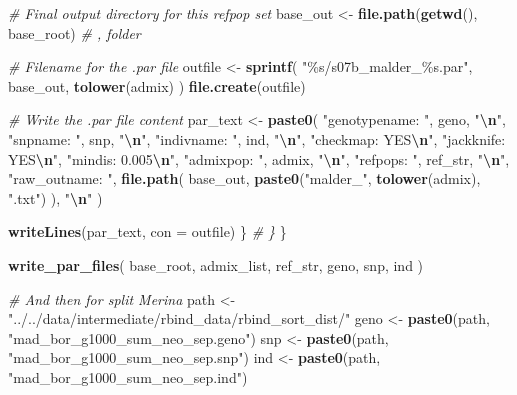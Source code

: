 \documentclass[
]{article}
\newenvironment{Shaded}{\begin{snugshade}}{\end{snugshade}}
\newcommand{\AttributeTok}[1]{\textcolor[rgb]{0.13,0.29,0.53}{#1}}
\newcommand{\CommentTok}[1]{\textcolor[rgb]{0.56,0.35,0.01}{\textit{#1}}}
\newcommand{\FunctionTok}[1]{\textcolor[rgb]{0.13,0.29,0.53}{\textbf{#1}}}
\newcommand{\NormalTok}[1]{#1}
\newcommand{\OtherTok}[1]{\textcolor[rgb]{0.56,0.35,0.01}{#1}}
\newcommand{\SpecialCharTok}[1]{\textcolor[rgb]{0.81,0.36,0.00}{\textbf{#1}}}
\newcommand{\StringTok}[1]{\textcolor[rgb]{0.31,0.60,0.02}{#1}}
\begin{document}
\begin{Shaded}
\begin{Highlighting}[]
    \CommentTok{\# Final output directory for this refpop set}
\NormalTok{    base\_out }\OtherTok{\textless{}{-}} \FunctionTok{file.path}\NormalTok{(}\FunctionTok{getwd}\NormalTok{(), base\_root) }\CommentTok{\# , folder}

    \CommentTok{\# Filename for the .par file}
\NormalTok{    outfile }\OtherTok{\textless{}{-}} \FunctionTok{sprintf}\NormalTok{(}
      \StringTok{"\%s/s07b\_malder\_\%s.par"}\NormalTok{,}
\NormalTok{      base\_out, }\FunctionTok{tolower}\NormalTok{(admix)}
\NormalTok{    )}
    \FunctionTok{file.create}\NormalTok{(outfile)}

    \CommentTok{\# Write the .par file content}
\NormalTok{    par\_text }\OtherTok{\textless{}{-}} \FunctionTok{paste0}\NormalTok{(}
      \StringTok{"genotypename: "}\NormalTok{, geno, }\StringTok{"}\SpecialCharTok{\textbackslash{}n}\StringTok{"}\NormalTok{,}
      \StringTok{"snpname: "}\NormalTok{, snp, }\StringTok{"}\SpecialCharTok{\textbackslash{}n}\StringTok{"}\NormalTok{,}
      \StringTok{"indivname: "}\NormalTok{, ind, }\StringTok{"}\SpecialCharTok{\textbackslash{}n}\StringTok{"}\NormalTok{,}
      \StringTok{"checkmap: YES}\SpecialCharTok{\textbackslash{}n}\StringTok{"}\NormalTok{,}
      \StringTok{"jackknife: YES}\SpecialCharTok{\textbackslash{}n}\StringTok{"}\NormalTok{,}
      \StringTok{"mindis: 0.005}\SpecialCharTok{\textbackslash{}n}\StringTok{"}\NormalTok{,}
      \StringTok{"admixpop: "}\NormalTok{, admix, }\StringTok{"}\SpecialCharTok{\textbackslash{}n}\StringTok{"}\NormalTok{,}
      \StringTok{"refpops: "}\NormalTok{, ref\_str, }\StringTok{"}\SpecialCharTok{\textbackslash{}n}\StringTok{"}\NormalTok{,}
      \StringTok{"raw\_outname: "}\NormalTok{, }\FunctionTok{file.path}\NormalTok{(}
\NormalTok{        base\_out,}
        \FunctionTok{paste0}\NormalTok{(}\StringTok{"malder\_"}\NormalTok{, }\FunctionTok{tolower}\NormalTok{(admix), }\StringTok{".txt"}\NormalTok{)}
\NormalTok{      ), }\StringTok{"}\SpecialCharTok{\textbackslash{}n}\StringTok{"}
\NormalTok{    )}

    \FunctionTok{writeLines}\NormalTok{(par\_text, }\AttributeTok{con =}\NormalTok{ outfile)}
\NormalTok{  \}}
  \CommentTok{\# \}}
\NormalTok{\}}

\FunctionTok{write\_par\_files}\NormalTok{(}
\NormalTok{  base\_root,}
\NormalTok{  admix\_list,}
\NormalTok{  ref\_str,}
\NormalTok{  geno,}
\NormalTok{  snp,}
\NormalTok{  ind}
\NormalTok{)}

\CommentTok{\# And then for split Merina}
\NormalTok{path }\OtherTok{\textless{}{-}} \StringTok{"../../data/intermediate/rbind\_data/rbind\_sort\_dist/"}
\NormalTok{geno }\OtherTok{\textless{}{-}}
  \FunctionTok{paste0}\NormalTok{(path, }\StringTok{"mad\_bor\_g1000\_sum\_neo\_sep.geno"}\NormalTok{)}
\NormalTok{snp }\OtherTok{\textless{}{-}}
  \FunctionTok{paste0}\NormalTok{(path, }\StringTok{"mad\_bor\_g1000\_sum\_neo\_sep.snp"}\NormalTok{)}
\NormalTok{ind }\OtherTok{\textless{}{-}}
  \FunctionTok{paste0}\NormalTok{(path, }\StringTok{"mad\_bor\_g1000\_sum\_neo\_sep.ind"}\NormalTok{)}


\end{Highlighting}
\end{Shaded}
\end{document}
